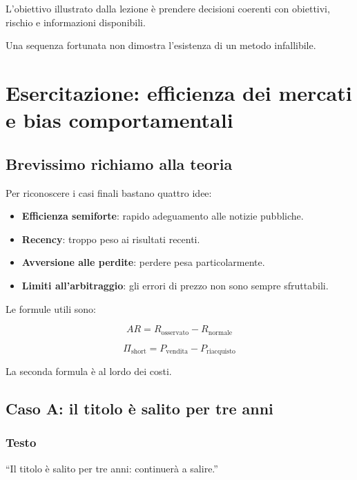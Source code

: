 \noindent L'obiettivo illustrato dalla lezione
è prendere decisioni coerenti
con obiettivi, rischio e informazioni disponibili.

\noindent Una sequenza fortunata
non dimostra l'esistenza
di un metodo infallibile.


\section{Esercitazione:
efficienza dei mercati e bias comportamentali}

\subsection{Brevissimo richiamo alla teoria}

\noindent Per riconoscere i casi finali
bastano quattro idee:

\begin{itemize}
    \item \textbf{Efficienza semiforte}:
    rapido adeguamento alle notizie pubbliche.

    \item \textbf{Recency}:
    troppo peso ai risultati recenti.

    \item \textbf{Avversione alle perdite}:
    perdere pesa particolarmente.

    \item \textbf{Limiti all'arbitraggio}:
    gli errori di prezzo
    non sono sempre sfruttabili.
\end{itemize}

\noindent Le formule utili sono:

\[
\boxed{
AR
=
R_{\mathrm{osservato}}
-
R_{\mathrm{normale}}
}
\]

\[
\boxed{
\Pi_{\mathrm{short}}
=
P_{\mathrm{vendita}}
-
P_{\mathrm{riacquisto}}
}
\]

\noindent La seconda formula
è al lordo dei costi.


\subsection{Caso A: il titolo è salito per tre anni}

\subsubsection*{Testo}

\noindent ``Il titolo è salito per tre anni:
continuerà a salire.''



